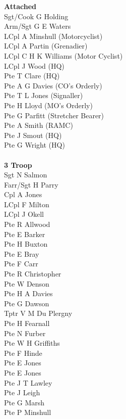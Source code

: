 \begin{multicols}{2}
  \textbf{Attached} \\
  Sgt/Cook G Holding \\
  Arm/Sgt G E Waters \\
  LCpl A Minshull (Motorcyclist) \\
  LCpl A Partin (Grenadier) \\
  LCpl C H K Williams (Motor Cyclist) \\
  LCpl J Wood (HQ) \\
  Pte T Clare (HQ) \\
  Pte A G Davies (CO's Orderly) \\
  Pte T L Jones (Signaller) \\
  Pte H Lloyd (MO's Orderly) \\
  Pte G Parfitt (Stretcher Bearer) \\
  Pte A Smith (RAMC) \\
  Pte J Smout (HQ) \\
  Pte G Wright (HQ) \\
  \\
  \textbf{3 Troop} \\
  Sgt N Salmon \\
  Farr/Sgt H Parry \\
  Cpl A Jones \\
  LCpl F Milton \\
  LCpl J Okell \\
  Pte R Allwood \\
  Pte E Barker \\
  Pte H Buxton \\
  Pte E Bray \\
  Pte F Carr \\
  Pte R Christopher \\
  Pte W Denson \\
  Pte H A Davies \\
  Pte G Dawson \\
  Tptr V M Du Plergny \\
  Pte H Fearnall \\
  Pte N Furber \\
  Pte W H Griffiths \\
  Pte F Hinde \\
  Pte E Jones \\
  Pte E Jones \\
  Pte J T Lawley \\
  Pte J Leigh \\
  Pte G Marsh \\
  Pte P Minshull \\

\end{multicols}
